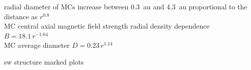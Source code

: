 radial diameter of MCs increase between 0.3~au and 4.3~au proportional to the distance as $r^{0.8}$ \citep{Bothmer1998}\\
MC central axial magnetic field strength radial density dependence $B = 18.1\,r^{-1.64}$ \citet{Leitner2007}\\
MC average diameter $D = 0.23\,r^{1.14}$ \citet{Leitner2007}

sw structure marked plots\\



\cleardoublepage

